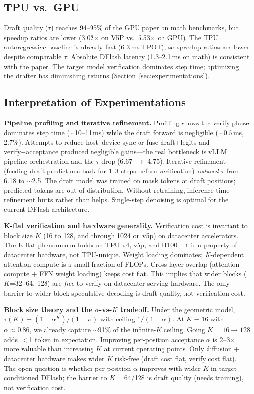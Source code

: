 \documentclass[12pt,letterpaper]{article}
\begin{document}
\subsection{TPU vs.\ GPU}

Draft quality ($\tau$) reaches 94--95\% of the GPU paper on math benchmarks, but speedup ratios are lower (3.02$\times$ on V5P vs.\ 5.53$\times$ on GPU). The TPU autoregressive baseline is already fast (6.3\,ms TPOT), so speedup ratios are lower despite comparable $\tau$. Absolute DFlash latency (1.3--2.1\,ms on math) is consistent with the paper. The target model verification dominates step time; optimizing the drafter has diminishing returns (Section~\ref{sec:experimentations}).

\subsection{Interpretation of Experimentations}

\textbf{Pipeline profiling and iterative refinement.} Profiling shows the verify phase dominates step time ($\sim$10--11\,ms) while the draft forward is negligible ($\sim$0.5\,ms, 2.7\%). Attempts to reduce host--device sync or fuse draft+logits and verify+acceptance produced negligible gains---the real bottleneck is vLLM pipeline orchestration and the $\tau$ drop (6.67 $\to$ 4.75). Iterative refinement (feeding draft predictions back for 1--3 steps before verification) \emph{reduced} $\tau$ from 6.18 to $\sim$2.5. The draft model was trained on mask tokens at draft positions; predicted tokens are out-of-distribution. Without retraining, inference-time refinement hurts rather than helps. Single-step denoising is optimal for the current DFlash architecture.

\textbf{K-flat verification and hardware generality.} Verification cost is invariant to block size $K$ (16 to 128, and through 1024 on v5p) on datacenter accelerators. The K-flat phenomenon holds on TPU v4, v5p, and H100---it is a property of datacenter hardware, not TPU-unique. Weight loading dominates; $K$-dependent attention compute is a small fraction of FLOPs. Cross-layer overlap (attention compute + FFN weight loading) keeps cost flat. This implies that wider blocks ($K$=32, 64, 128) are \emph{free} to verify on datacenter serving hardware. The only barrier to wider-block speculative decoding is draft quality, not verification cost.

\textbf{Block size theory and the $\alpha$-vs-$K$ tradeoff.} Under the geometric model, $\tau(K) = (1 - \alpha^K)/(1-\alpha)$ with ceiling $1/(1-\alpha)$. At $K=16$ with $\alpha \approx 0.86$, we already capture $\sim$91\% of the infinite-$K$ ceiling. Going $K=16 \to 128$ adds $<$1 token in expectation. Improving per-position acceptance $\alpha$ is 2--3$\times$ more valuable than increasing $K$ at current operating points. Only diffusion + datacenter hardware makes wider $K$ risk-free (draft cost flat, verify cost flat). The open question is whether per-position $\alpha$ improves with wider $K$ in target-conditioned DFlash; the barrier to $K=64$/128 is draft quality (needs training), not verification cost.
\end{document}
